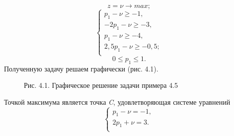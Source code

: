 \begin{equation}
\label{equation_4_23}
z=\nu \to max;
\end{equation}
\begin{equation}
\label{equation_4_24}
   \begin{cases}
p_1-\nu \geqslant -1, \\
-2p_1-\nu \geqslant -3, \\
p_1-\nu \geqslant -4, \\
2,5p_1-\nu\geqslant -0,5; \\
    \end{cases}
\end{equation}
\begin{equation}
\label{equation_4_25}
    0 \leqslant p_1 \leqslant 1.
\end{equation}
Полученную задачу решаем графически (рис. 4.1).
\begin{figure}[!h]
\caption*{Рис. 4.1. Графическое решение задачи примера 4.5}
\label{fig:image}
\end{figure}

Точкой максимума является точка \emph{C}, удовлетворяющая системе уравнений
\begin{equation}
\label{equation_4_26}
    \begin{cases}
    p_1-\nu=-1,  \\
    2p_1+\nu=3.  \\
    \end{cases}
\end{equation}


